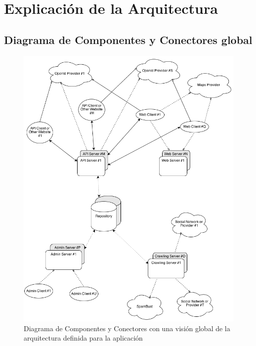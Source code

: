 \section*{Explicaci\'on de la Arquitectura}


\subsection*{Diagrama de Componentes y Conectores global}
\begin{figure}[hbtp]
\centering
\includegraphics[height=0.75\textheight,angle=90]{ISW2.cNc.v2}
\caption{Diagrama de Componentes y Conectores con una visi\'on global de la arquitectura definida para la aplicaci\'on}
\label{fig:cnc}
\end{figure}
